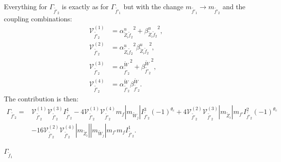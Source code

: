 \documentclass[final,3p,times]{elsarticle}
\begin{document}
Everything for $\Gamma_{\tilde{f'}_2}$ is exactly as for $\Gamma_{\tilde{f'}_1}$ but with the change $m_{\tilde{f'}_1} \rightarrow m_{\tilde{f'}_2}$ and the coupling combinations:
\begin{align}
\mathcal{V}_{\tilde{f'}_2}^{(1)} &= {\alpha_{\tilde{Z}_i \tilde{f}_2}^{u}}^2 + {\beta_{\tilde{Z}_i \tilde{f}_2}^{u}}^2, \\
\mathcal{V}_{\tilde{f'}_2}^{(2)} &= {\alpha_{\tilde{Z}_i \tilde{f}_2}^{u}}^2 {\beta_{\tilde{Z}_i \tilde{f}_2}^{u}}^2 , \\
\mathcal{V}_{\tilde{f'}_2}^{(3)} &= {\alpha_{\tilde{f'}_2}^{\tilde{W}}}^2 + {\beta_{\tilde{f'}_2}^{\tilde{W}}}^2, \\
\mathcal{V}_{\tilde{f'}_2}^{(4)} &= \alpha_{\tilde{f'}_2}^{\tilde{W}} \beta_{\tilde{f'}_2}^{\tilde{W}}.
\end{align}
The contribution is then:
\begin{equation}
\begin{aligned}
\Gamma_{\tilde{f'}_2} = & \mathcal{V}_{\tilde{f'}_2}^{(1)} \mathcal{V}_{\tilde{f'}_2}^{(3)} I_{\tilde{f'}_2}^{4} - 4 \mathcal{V}_{\tilde{f'}_2}^{(1)} \mathcal{V}_{\tilde{f'}_2}^{(4)} m_{f}|m_{\tilde{W}_j}| I_{\tilde{f'}_2}^{3}(-1)^{\theta_c} + 4 \mathcal{V}_{\tilde{f'}_2}^{(2)} \mathcal{V}_{\tilde{f'}_2}^{(3)} |m_{\tilde{Z}_i}|m_{f'} I_{\tilde{f'}_2}^{2} (-1)^{\theta_c} \\ & - 16 \mathcal{V}_{\tilde{f'}_2}^{(2)} \mathcal{V}_{\tilde{f'}_2}^{(4)} |m_{\tilde{Z}_i}||m_{\tilde{W}_j}|m_{f'}m_{f} I_{\tilde{f'}_2}^{1}.
\end{aligned}
\end{equation}

\textbf{\underline{$\Gamma_{\tilde{f}_1}$}}
\end{document}
